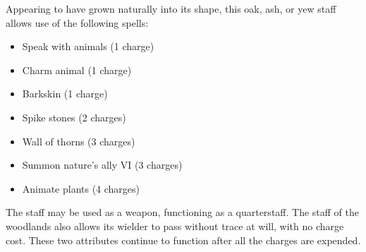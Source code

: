  Appearing to have grown naturally into its shape, this oak, ash, or yew staff allows use of the following spells:
\begin{itemize}
\item Speak with animals (1 charge)
\item Charm animal (1 charge)
\item Barkskin (1 charge)
\item Spike stones (2 charges)
\item Wall of thorns (3 charges)
\item Summon nature's ally VI (3 charges)
\item Animate plants (4 charges)
\end{itemize}

The staff may be used as a weapon, functioning as a  quarterstaff. The staff of the woodlands also allows its wielder to pass without trace at will, with no charge cost. These two attributes continue to function after all the charges are expended.


